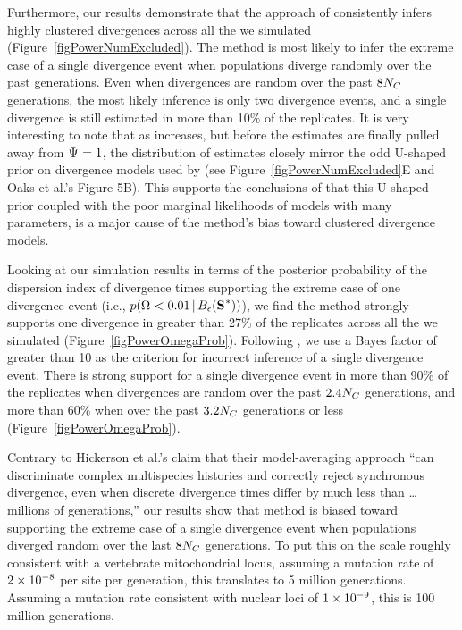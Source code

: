 \documentclass[letterpaper,12pt]{article}
\begin{document}
\begin{linenumbers}
Furthermore, our results demonstrate that the approach of \citet{Hickerson2013}
consistently infers highly clustered divergences across all the  we
simulated (Figure~\ref{figPowerNumExcluded}).
The method is most likely to infer the extreme case of a single divergence event
when populations diverge randomly over the past \globalcoalunit generations.
Even when divergences are random over the past $8N_C$ generations,
the most likely inference is only two divergence events, and a single 
divergence is still estimated in more than 10\% of the replicates.
It is very interesting to note that as  increases, but before the
estimates are finally pulled away from $\Psi_{} = 1$, the distribution of
\numt{} estimates closely mirror the odd U-shaped prior on divergence models
used by \msb (see Figure~\ref{figPowerNumExcluded}E and Oaks et al.'s
\citeyear{Oaks2012} Figure 5B).
This supports the conclusions of \citet{Oaks2012} that this U-shaped
prior coupled with the poor marginal likelihoods of models with many
\divt{} parameters, is a major cause of the method's bias toward
clustered divergence models.

Looking at our simulation results in terms of the posterior probability of the
dispersion index of divergence times supporting the extreme case of one
divergence event (i.e., $p(\vmratio{} < 0.01 \given \ssSpace)$), we find the
method strongly supports one divergence in greater than 27\% of the replicates
across all the  we simulated (Figure~\ref{figPowerOmegaProb}).
Following \citet{Hickerson2013}, we use a Bayes factor of greater than 10 as
the criterion for incorrect inference of a single divergence event.
There is strong support for a single divergence event in more than 90\% of the
replicates when divergences are random over the past $2.4N_C$
generations, and more than 60\% when over the past $3.2N_C$
generations or less (Figure~\ref{figPowerOmegaProb}).

Contrary to Hickerson et al.'s \citeyear{Hickerson2013} claim that their
model-averaging approach ``can discriminate complex multispecies histories and
correctly reject synchronous divergence, even when discrete divergence times
differ by much less than \ldots millions of generations,'' our results show
that method is biased toward supporting the extreme case of a single
divergence event when populations diverged random over the last
$8N_C$ generations.
To put this on the scale roughly consistent with a vertebrate mitochondrial
locus, assuming a mutation rate of $2\times 10^{-8}$ per site per generation, this
translates to 5 million generations.
Assuming a mutation rate consistent with nuclear loci of $1\times 10^{-9}$, this is 100
million generations.


\end{linenumbers}
\end{document}
